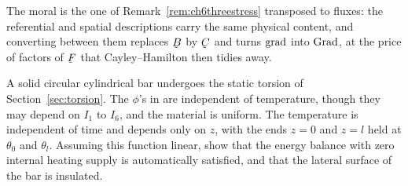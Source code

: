\begin{solution}
The moral is the one of Remark~\ref{rem:ch6threestress} transposed to
fluxes: the referential and spatial descriptions carry the same physical
content, and converting between them replaces $\bB$ by $\bC$ and turns
$\operatorname{grad}$ into $\operatorname{Grad}$, at the price of factors of $\bF$ that
Cayley--Hamilton then tidies away.
\end{solution}

\begin{problem}
A solid circular cylindrical bar undergoes the static torsion of
Section~\ref{sec:torsion}. The $\phi$'s in  are independent
of temperature, though they may depend on $I_{1}$ to $I_{6}$, and the
material is uniform. The temperature is independent of time and depends
only on $z$, with the ends $z=0$ and $z=l$ held at $\theta_{0}$ and
$\theta_{l}$. Assuming this function linear, show that the energy
balance with zero internal heating supply is automatically satisfied,
and that the lateral surface of the bar is insulated.
\end{problem}

